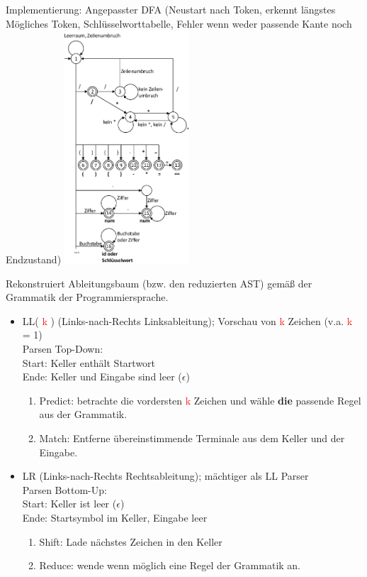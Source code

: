 Implementierung: Angepasster DFA (Neustart nach Token, erkennt längstes Mögliches Token, Schlüsselworttabelle, Fehler wenn weder passende Kante noch Endzustand)
\includegraphics[angle=90,width=0.35\textwidth]{scanner}
\newcommand{\K}{ \textcolor{red}{k} }


Rekonstruiert Ableitungsbaum (bzw. den reduzierten AST) gemäß der Grammatik der Programmiersprache.
\begin{itemize}
\item LL(\K) (Links-nach-Rechts Linksableitung); Vorschau von \K Zeichen (v.a. \K = 1)\\ 
		Parsen Top-Down: \\
		Start: Keller enthält Startwort\\
		Ende: Keller und Eingabe sind leer ($\epsilon$)
	\begin{enumerate}
		\item Predict: betrachte die vordersten \K Zeichen und wähle \textbf{die} passende Regel aus der Grammatik.
		\item Match: Entferne übereinstimmende Terminale aus dem Keller und der Eingabe.
	\end{enumerate}
	
	
\item LR (Links-nach-Rechts Rechtsableitung); mächtiger als LL Parser\\
	Parsen Bottom-Up:\\
		Start: Keller ist leer ($\epsilon$)\\
		Ende: Startsymbol im Keller, Eingabe leer
	\begin{enumerate}
		\item Shift: Lade nächstes Zeichen in den Keller
		\item Reduce: wende wenn möglich eine Regel der Grammatik an.
	\end{enumerate}
		

\end{itemize}

